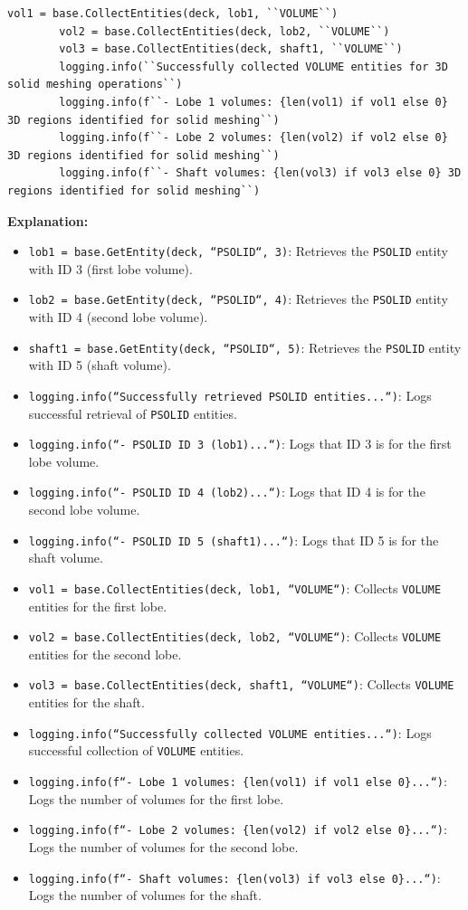 \documentclass{book}
\begin{document}
\begin{itemize}[leftmargin=*,label=\textbullet]
\begin{lstlisting}[caption={MeshProcessor Class - Solid Element Retrieval},label={lst:meshprocessor_4}]
        vol1 = base.CollectEntities(deck, lob1, ``VOLUME``)
        vol2 = base.CollectEntities(deck, lob2, ``VOLUME``)
        vol3 = base.CollectEntities(deck, shaft1, ``VOLUME``)
        logging.info(``Successfully collected VOLUME entities for 3D solid meshing operations``)
        logging.info(f``- Lobe 1 volumes: {len(vol1) if vol1 else 0} 3D regions identified for solid meshing``)
        logging.info(f``- Lobe 2 volumes: {len(vol2) if vol2 else 0} 3D regions identified for solid meshing``)
        logging.info(f``- Shaft volumes: {len(vol3) if vol3 else 0} 3D regions identified for solid meshing``)
\end{lstlisting}
\textbf{Explanation:}
\begin{itemize}
    \item \texttt{lob1 = base.GetEntity(deck, ``PSOLID``, 3)}: Retrieves the \texttt{PSOLID} entity with ID 3 (first lobe volume).
    \item \texttt{lob2 = base.GetEntity(deck, ``PSOLID``, 4)}: Retrieves the \texttt{PSOLID} entity with ID 4 (second lobe volume).
    \item \texttt{shaft1 = base.GetEntity(deck, ``PSOLID``, 5)}: Retrieves the \texttt{PSOLID} entity with ID 5 (shaft volume).
    \item \texttt{logging.info(``Successfully retrieved PSOLID entities...``)}: Logs successful retrieval of \texttt{PSOLID} entities.
    \item \texttt{logging.info(``- PSOLID ID 3 (lob1)...``)}: Logs that ID 3 is for the first lobe volume.
    \item \texttt{logging.info(``- PSOLID ID 4 (lob2)...``)}: Logs that ID 4 is for the second lobe volume.
    \item \texttt{logging.info(``- PSOLID ID 5 (shaft1)...``)}: Logs that ID 5 is for the shaft volume.
    \item \texttt{vol1 = base.CollectEntities(deck, lob1, ``VOLUME``)}: Collects \texttt{VOLUME} entities for the first lobe.
    \item \texttt{vol2 = base.CollectEntities(deck, lob2, ``VOLUME``)}: Collects \texttt{VOLUME} entities for the second lobe.
    \item \texttt{vol3 = base.CollectEntities(deck, shaft1, ``VOLUME``)}: Collects \texttt{VOLUME} entities for the shaft.
    \item \texttt{logging.info(``Successfully collected VOLUME entities...``)}: Logs successful collection of \texttt{VOLUME} entities.
    \item \texttt{logging.info(f``- Lobe 1 volumes: \{len(vol1) if vol1 else 0\}...``)}: Logs the number of volumes for the first lobe.
    \item \texttt{logging.info(f``- Lobe 2 volumes: \{len(vol2) if vol2 else 0\}...``)}: Logs the number of volumes for the second lobe.
    \item \texttt{logging.info(f``- Shaft volumes: \{len(vol3) if vol3 else 0\}...``)}: Logs the number of volumes for the shaft.
\end{itemize}


\end{itemize}
\end{document}
